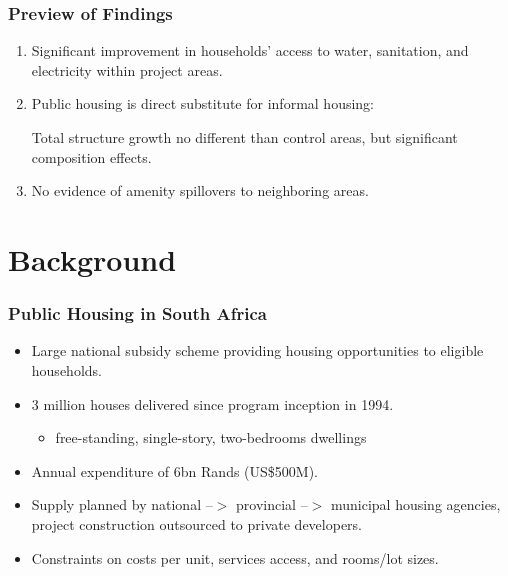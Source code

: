 \documentclass[aspectratio=32]{beamer}
\begin{document}
\begin{frame}
\frametitle{Preview of Findings}

\centering
\begin{enumerate}


\item<1-> Significant improvement in households' access to water, sanitation, and electricity within project areas.
\vspace{2mm}
\item<2-> Public housing is direct substitute for informal housing: 

Total structure growth no different than control areas, but significant composition effects.
\vspace{2mm}
\item<3-> No evidence of amenity spillovers to neighboring areas. 

\end{enumerate}

\end{frame}


\section{Background}


\begin{frame}
\frametitle{Public Housing in South Africa}
  \begin{itemize}
    \item Large national subsidy scheme providing housing opportunities to eligible households.
    \vspace{2mm}
    \item 3 million houses delivered since program inception in 1994.\
        \begin{itemize}
          \item free-standing, single-story, two-bedrooms dwellings
        \end{itemize}
    \vspace{2mm}
    \item Annual expenditure of 6bn Rands (US\$500M).
    \vspace{2mm}
    \item Supply planned by national --$>$ provincial --$>$ municipal housing agencies, project construction outsourced to private developers.
    \vspace{2mm} 
    \item Constraints on costs per unit, services access, and rooms/lot sizes.
  \end{itemize}
\end{frame}
\end{document}
